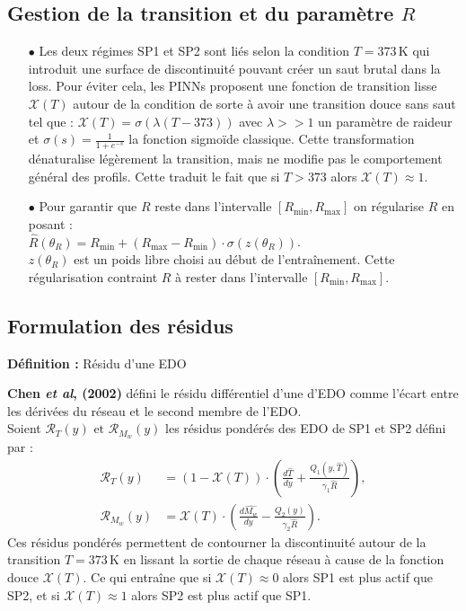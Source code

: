 \documentclass[12pt, oneside]{report} %
\theoremstyle{definition}
\theoremstyle{remark}
\begin{document}
	\subsection{Gestion de la transition et du paramètre $R$}
	\begin{itemize}
		\item[$\bullet$] Les deux régimes SP1 et SP2 sont liés selon la condition $T=373\,\mathrm{K}$ qui introduit une surface de discontinuité pouvant créer un saut brutal dans la loss. Pour éviter cela, les PINNs proposent une fonction de transition lisse $\mathcal{X}(T)$ autour de la condition de sorte à avoir une transition douce sans saut tel que : $\mathcal{X}(T) = \sigma\left(\lambda\left(T-373\right)\right)$ avec $\lambda >> 1$ un paramètre de raideur et $\sigma(s) = \frac{1}{1+e^{-s}}$ la fonction sigmoïde classique. Cette transformation dénaturalise légèrement la transition, mais ne modifie pas le comportement général des profils. Cette traduit le fait que si $T>373$ alors $\mathcal{X}(T) \approx 1$.		
		\item[$\bullet$] Pour garantir que $R$ reste dans l'intervalle $\left[R_{\text{min}}, R_{\text{max}}\right]$ on régularise $R$ en posant :\\ $\hat{R}(\theta_R) = R_{\text{min}} + (R_{\text{max}} - R_{\text{min}})\cdot\sigma\left(z(\theta_R)\right)$. \\ $ z(\theta_R)$ est un poids libre choisi au début de l'entraînement.
		Cette régularisation contraint $R$ à rester dans l'intervalle $\left[R_{\text{min}},R_{\text{max}}\right]$. 
		\end{itemize}
		\subsection{Formulation des résidus}
		
		\textbf{Définition : }Résidu d'une EDO \
			
			\textbf{Chen \textit{et al}, (2002)} défini le résidu différentiel d'une d'EDO comme l'écart entre les dérivées du réseau et le second membre de l'EDO.\\ 
			Soient $\mathcal{R}_T(y) \text{ et }\mathcal{R}_{M_w}(y) $ les résidus pondérés des EDO de SP1 et SP2 défini par : 
			\begin{align}\label{f:residu}
				\mathcal{R}_T(y) &= \left(1-\mathcal{X}(T)\right)\cdot\left(\frac{d\hat{T}}{dy} + \frac{Q_1(y, \hat{T})}{\gamma_1 \hat{R}}\right),  \\ 
				\mathcal{R}_{M_w}(y) &= \mathcal{X}(T)\cdot\left(\frac{d\hat{M_w}}{dy} - \frac{Q_2(y)}{\gamma_2 \hat{R}}\right).
			\end{align} 
			Ces résidus pondérés permettent de contourner la discontinuité autour de la transition $T = 373\,\mathrm{K}$ en lissant la sortie de chaque réseau à cause de la fonction douce $\mathcal{X}(T)$. Ce qui entraîne que si $\mathcal{X}(T) \approx 0$ alors SP1 est plus actif que SP2, et si $\mathcal{X}(T) \approx 1$ alors SP2 est plus actif que SP1.
			
\end{document}
